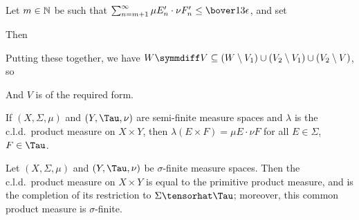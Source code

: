 {\noindent   Let $m\in\Bbb N$ be such that
$\sum_{n=m+1}^{\infty}\mu E'_n\cdot\nu F'_n\le\bover13\epsilon$, and set


\noindent Then


Putting these together, we have
$W\symmdiff V\subseteq(W\setminus V_1)\cup(V_2\setminus
V_1)\cup(V_2\setminus V)$, so


\noindent And $V$ is of the required form.
}

 If $(X,\Sigma,\mu)$ and $(Y,\Tau,\nu)$ are
semi-finite measure spaces and $\lambda$ is the c.l.d.\ product measure
on $X\times Y$, then $\lambda(E\times F)=\mu E\cdot\nu F$ for all
$E\in\Sigma$, $F\in\Tau$.


 Let $(X,\Sigma,\mu)$ and $(Y,\Tau,\nu)$ be
$\sigma$-finite measure spaces.   Then the c.l.d.\ product measure on
$X\times Y$ is equal to the primitive product measure, and is the
completion of its restriction to $\Sigma\tensorhat\Tau$;  moreover, this
common product measure is $\sigma$-finite.

